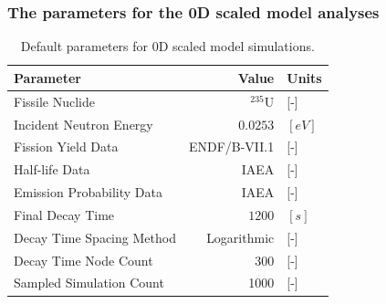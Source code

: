 \begin{frame}
    \frametitle{The parameters for the 0D scaled model analyses}

    \begin{table}[]
    \centering
    \caption{Default parameters for 0D scaled model simulations.}
    \begin{tabular}{lrl}
        \hline
        Parameter & Value & Units\\
        \hline
        \rule{0pt}{2ex}\vspace{0.1 mm}Fissile Nuclide & \vspace{0.1 mm}$^{235}$U & [-]\\
        Incident Neutron Energy & $0.0253$ &$ [eV]$\\
        Fission Yield Data & ENDF/B-VII.1 \cite{chadwick2011endf} & [-]\\
        Half-life Data & IAEA \cite{DIMITRIOU2021144} & [-]\\
        Emission Probability Data & IAEA \cite{DIMITRIOU2021144} & [-]\\
        Final Decay Time & $1200$ & $[s]$\\
        Decay Time Spacing Method & Logarithmic & [-]\\
        Decay Time Node Count & 300 & [-]\\
        Sampled Simulation Count & 1000 & [-]\\
        \hline
    \end{tabular}
    \label{tab:default-0dsacled}
\end{table}
\end{frame}

